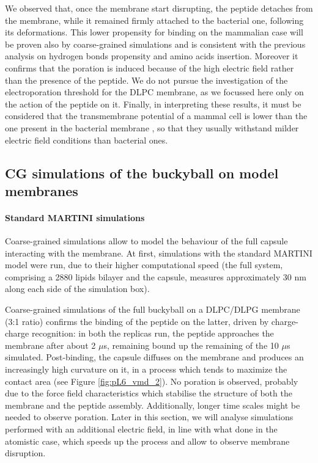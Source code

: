 We observed that, once the membrane start disrupting, the peptide detaches from the membrane, while it remained firmly attached to the bacterial one, following its deformations. This lower propensity for binding on the mammalian case will be proven also by coarse-grained simulations and is consistent with the previous analysis on hydrogen bonds propensity and amino acids insertion. Moreover it confirms that the poration is induced because of the high electric field rather than the presence of the peptide. We do not pursue the investigation of the electroporation threshold for the DLPC membrane, as we focussed here only on the action of the peptide on it.
%
Finally, in interpreting these results, it must be considered that the transmembrane potential of a mammal cell is lower than the one present in the bacterial membrane \citep{Yeaman2003,Wilson2011}, so that they usually withstand milder electric field conditions than bacterial ones.


\subsection{CG simulations of the buckyball on model membranes} \label{sec:results_lip_cg}

\paragraph{Standard MARTINI simulations} Coarse-grained simulations allow to model the behaviour of the full capsule interacting with the membrane.
%
At first, simulations with the standard MARTINI model were run, due to their higher computational speed (the full system, comprising a 2880 lipids bilayer and the capsule, measures approximately 30 nm along each side of the simulation box).

Coarse-grained simulations of the full buckyball on a DLPC/DLPG membrane (3:1 ratio) confirms the binding of the peptide on the latter, driven by charge-charge recognition: in both the replicas run, the peptide approaches the membrane after about 2 $\mu$s, remaining bound up the remaining of the 10 $\mu$s simulated.
%
Post-binding, the capsule diffuses on the membrane and produces an increasingly high curvature on it, in a process which tends to maximize the contact area (see Figure \ref{fig:pL6_vmd_2}). No poration is observed, probably due to the force field characteristics which stabilise the structure of both the membrane and the peptide assembly. Additionally, longer time scales might be needed to observe poration. Later in this section, we will analyse simulations performed with an additional electric field, in line with what done in the atomistic case, which speeds up the process and allow to observe membrane disruption.

